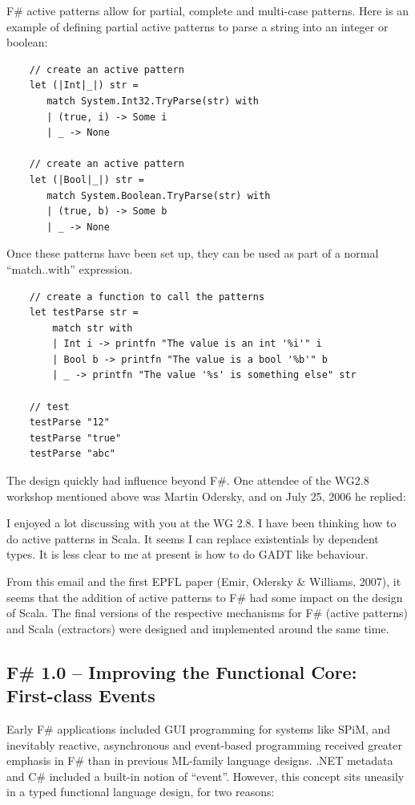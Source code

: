 \documentclass[acmsmall]{acmart}\settopmatter{}
\begin{document}
F\# active patterns allow for partial, complete and multi-case patterns. Here is an example of defining partial active patterns to parse a string into an integer or boolean:

\begin{verbatim}
    // create an active pattern
    let (|Int|_|) str =
       match System.Int32.TryParse(str) with
       | (true, i) -> Some i
       | _ -> None

    // create an active pattern
    let (|Bool|_|) str =
       match System.Boolean.TryParse(str) with
       | (true, b) -> Some b
       | _ -> None
\end{verbatim}
Once these patterns have been set up, they can be used as part of a normal “match..with” expression.

\begin{verbatim}
    // create a function to call the patterns
    let testParse str = 
        match str with
        | Int i -> printfn "The value is an int '%i'" i
        | Bool b -> printfn "The value is a bool '%b'" b
        | _ -> printfn "The value '%s' is something else" str

    // test
    testParse "12"
    testParse "true"
    testParse "abc"
\end{verbatim}

The design quickly had influence beyond F\#. One attendee of the WG2.8 workshop mentioned above was Martin Odersky, and on July 25, 2006 he replied:

\begin{verbquote}
I enjoyed a lot discussing with you at the WG 2.8. I have been thinking how to do active patterns in Scala. It seems I can replace existentials by dependent types. It is less clear to me at present is how to do GADT like behaviour. 
\end{verbquote}


From this email and the first EPFL paper (Emir, Odersky \& Williams, 2007), it seems that the addition of active patterns to F\# had some impact on the design of Scala. The final versions of the respective mechanisms for F\# (active patterns) and Scala (extractors) were designed and implemented around the same time.    


\subsection*{F\# 1.0 – Improving the Functional Core: First-class Events}

Early F\# applications included GUI programming for systems like SPiM, and inevitably reactive, asynchronous and event-based programming received greater emphasis in F\# than in previous ML-family language designs. .NET metadata and C\# included a built-in notion of “event”. However, this concept sits uneasily in a typed functional language design, for two reasons:
\end{document}
